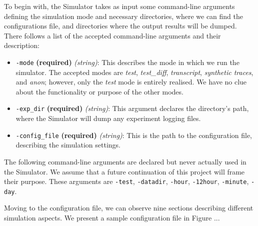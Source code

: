 \documentclass[logo,msc,cyber]{infthesis}   %
\begin{document}
To begin with, the Simulator takes as input some command-line arguments defining
the simulation mode and necessary directories, where we can find the
configurations file, and directories where the output results will be dumped.
There follows a list of the accepted command-line arguments and their
description:

\begin{itemize}
    \item[] \texttt{-mode} \textbf{(required)} \textit{(string)}: This describes
    the mode in which we run the simulator. The accepted modes are \emph{test},
    \emph{test\_diff}, \emph{transcript}, \emph{synthetic traces}, and
    \emph{anon}; however, only the \emph{test} mode is entirely realised. We have no
    clue about the functionality or purpose of the other modes.
    \item[] \texttt{-exp\_dir} \textbf{(required)} \textit{(string)}: This argument
    declares the directory's path, where the Simulator will dump any experiment
    logging files.
    \item[] \texttt{-config\_file} \textbf{(required)} \textit{(string)}: This is
    the path to the configuration file, describing the simulation settings.
 \end{itemize}

The following command-line arguments are declared but never actually used in the
Simulator. We assume that a future continuation of this project will frame their
purpose. These arguments are \texttt{-test}, \texttt{-datadir}, \texttt{-hour},
\texttt{-12hour}, \texttt{-minute}, \texttt{-day}.

Moving to the configuration file, we can observe nine sections describing
different simulation aspects. We present a sample configuration file in Figure
...
\end{document}
